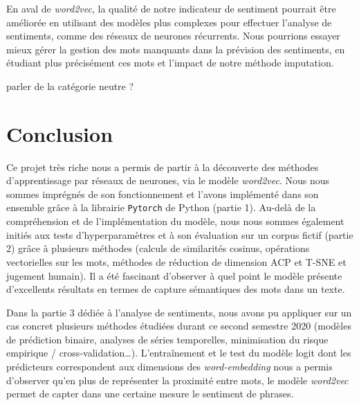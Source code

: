 \documentclass[11pt,french,french]{article}
\begin{document}
En aval de \emph{word2vec}, la qualité de notre indicateur de sentiment pourrait être améliorée en utilisant des modèles plus complexes pour effectuer l'analyse de sentiments, comme des réseaux de neurones récurrents.
Nous pourrions essayer mieux gérer la gestion des mots manquants dans la prévision des sentiments, en étudiant plus précisément ces mots et l'impact de notre méthode imputation.

\colorbox{BurntOrange}{parler de la catégorie neutre ?}

\newpage

\hypertarget{conclusion}{%
\section*{Conclusion}\label{conclusion}}

Ce projet très riche nous a permis de partir à la découverte des méthodes d'apprentissage par réseaux de neurones, via le modèle \emph{word2vec}.
Nous nous sommes imprégnés de son fonctionnement et l'avons implémenté dans son ensemble grâce à la librairie \texttt{Pytorch} de Python (partie 1).
Au-delà de la compréhension et de l'implémentation du modèle, nous nous sommes également initiés aux tests d'hyperparamètres et à son évaluation sur un corpus fictif (partie 2) grâce à plusieurs méthodes (calculs de similarités cosinus, opérations vectorielles sur les mots, méthodes de réduction de dimension ACP et T-SNE et jugement humain).
Il a été fascinant d'observer à quel point le modèle présente d'excellents résultats en termes de capture sémantiques des mots dans un texte.

Dans la partie 3 dédiée à l'analyse de sentiments, nous avons pu appliquer sur un cas concret plusieurs méthodes étudiées durant ce second semestre 2020 (modèles de prédiction binaire, analyses de séries temporelles, minimisation du risque empirique / cross-validation\dots).
L'entraînement et le test du modèle logit dont les prédicteurs correspondent aux dimensions des \emph{word-embedding} nous a permis d'observer qu'en plus de représenter la proximité entre mots, le modèle \emph{word2vec} permet de capter dans une certaine mesure le sentiment de phrases.
\end{document}
